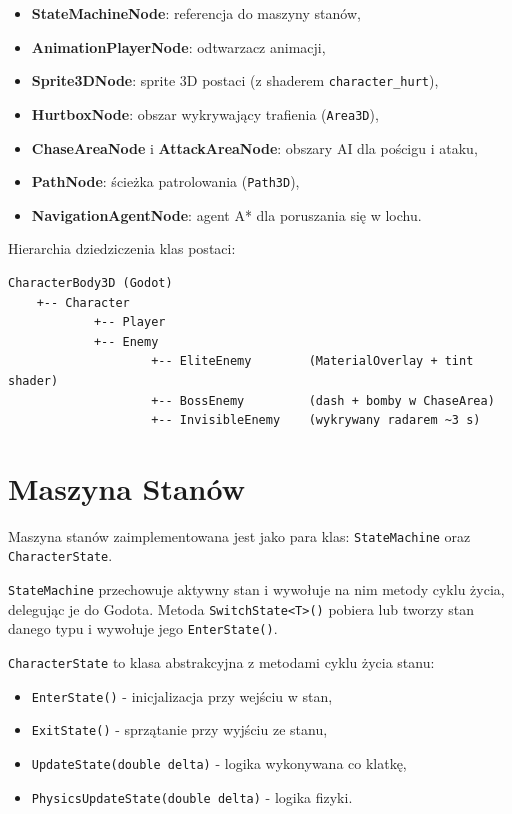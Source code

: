 \begin{itemize}
    \item \textbf{StateMachineNode}: referencja do maszyny stanów,
    \item \textbf{AnimationPlayerNode}: odtwarzacz animacji,
    \item \textbf{Sprite3DNode}: sprite 3D postaci (z shaderem \texttt{character\_hurt}),
    \item \textbf{HurtboxNode}: obszar wykrywający trafienia (\texttt{Area3D}),
    \item \textbf{ChaseAreaNode} i \textbf{AttackAreaNode}: obszary AI dla pościgu i ataku,
    \item \textbf{PathNode}: ścieżka patrolowania (\texttt{Path3D}),
    \item \textbf{NavigationAgentNode}: agent A* dla poruszania się w lochu.
\end{itemize}

Hierarchia dziedziczenia klas postaci:

{\small
\begin{verbatim}
CharacterBody3D (Godot)
    +-- Character
            +-- Player
            +-- Enemy
                    +-- EliteEnemy        (MaterialOverlay + tint shader)
                    +-- BossEnemy         (dash + bomby w ChaseArea)
                    +-- InvisibleEnemy    (wykrywany radarem ~3 s)
\end{verbatim}
}

\section{Maszyna Stanów}

Maszyna stanów zaimplementowana jest jako para klas: \texttt{StateMachine} oraz \texttt{CharacterState}.

\texttt{StateMachine} przechowuje aktywny stan i wywołuje na nim metody cyklu życia, delegując je do Godota. Metoda \texttt{SwitchState<T>()} pobiera lub tworzy stan danego typu i wywołuje jego \texttt{EnterState()}.

\texttt{CharacterState} to klasa abstrakcyjna z metodami cyklu życia stanu:
\begin{itemize}
    \item \texttt{EnterState()} - inicjalizacja przy wejściu w stan,
    \item \texttt{ExitState()} - sprzątanie przy wyjściu ze stanu,
    \item \texttt{UpdateState(double delta)} - logika wykonywana co klatkę,
    \item \texttt{PhysicsUpdateState(double delta)} - logika fizyki.
\end{itemize}

